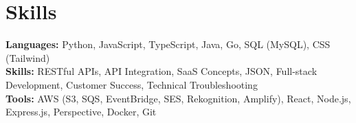 \documentclass[11pt]{article}       %
\begin{document}
\vspace{-18.5pt}


\section*{Skills}
\textbf{Languages:} Python, JavaScript, TypeScript, Java, Go, SQL (MySQL), CSS (Tailwind)\\
\textbf{Skills:} RESTful APIs, API Integration, SaaS Concepts, JSON, Full-stack Development, Customer Success, Technical Troubleshooting\\
\textbf{Tools:} AWS (S3, SQS, EventBridge, SES, Rekognition, Amplify), React, Node.js, Express.js, Perspective, Docker, Git\\

\vspace{-6.5pt}
\end{document}
